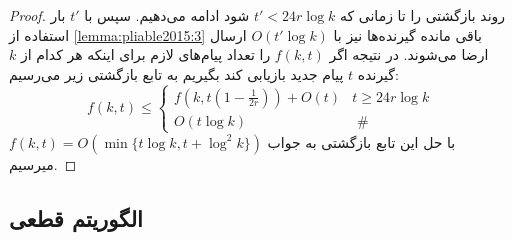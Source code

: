 \begin{proof}
			 روند بازگشتی را تا زمانی که
			 $t' < 24r \log k$
			 شود ادامه می‌دهیم. سپس با 
			 $t'$
			 بار استفاده از 
			 \autoref{lemma:pliable2015:3}
			 باقی مانده گیرنده‌ها نیز با
			 $O(t' \log k)$
			 ارسال ارضا می‌شوند. در نتیجه اگر
			 $f(k, t)$
			 را تعداد پیام‌های لازم برای اینکه هر کدام از
			 $k$
			  گیرنده
			 $t$
			 پیام جدید بازیابی کند بگیریم به تابع بازگشتی زیر می‌رسیم:
			 \begin{equation}
			 	f(k, t) \leq \begin{cases}f\left(k, t\left(1-\frac{1}{2 r}\right)\right)+O(t) & t \geq 24 r \log k \\ O(t \log k) & \text { \# }\end{cases}
			 \end{equation}
			 با حل این تابع بازگشتی به جواب
			 $f(k, t) = O(\min\{t \log k, t + \log^2 k\})$
			 میرسیم.
\end{proof}
\subsubsection{}
\subsection{الگوریتم قطعی}
\subsubsection{}











